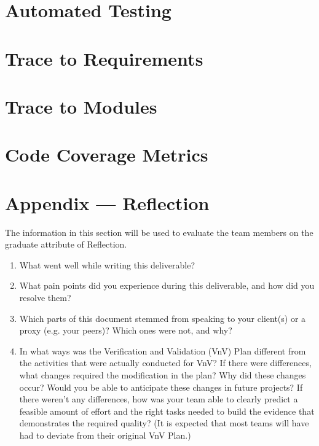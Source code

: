 \documentclass[12pt, titlepage]{article}
\begin{document}

\section{Automated Testing}
		
\section{Trace to Requirements}
		
\section{Trace to Modules}		

\section{Code Coverage Metrics}




\newpage{}
\section*{Appendix --- Reflection}

The information in this section will be used to evaluate the team members on the
graduate attribute of Reflection.



\begin{enumerate}
  \item What went well while writing this deliverable? 
  \item What pain points did you experience during this deliverable, and how
    did you resolve them?
  \item Which parts of this document stemmed from speaking to your client(s) or
  a proxy (e.g. your peers)? Which ones were not, and why?
  \item In what ways was the Verification and Validation (VnV) Plan different
  from the activities that were actually conducted for VnV?  If there were
  differences, what changes required the modification in the plan?  Why did
  these changes occur?  Would you be able to anticipate these changes in future
  projects?  If there weren't any differences, how was your team able to clearly
  predict a feasible amount of effort and the right tasks needed to build the
  evidence that demonstrates the required quality?  (It is expected that most
  teams will have had to deviate from their original VnV Plan.)
\end{enumerate}
\end{document}
